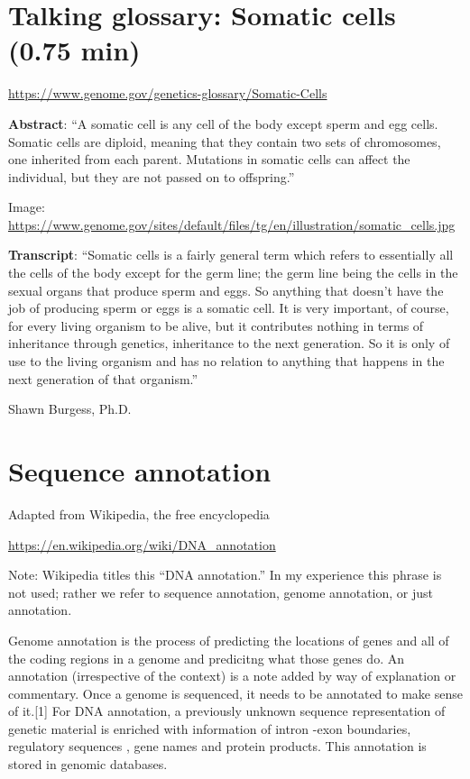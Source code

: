 \documentclass[
]{book}
\begin{document}
\hypertarget{talking-glossary-somatic-cells-0.75-min}{%
\section{Talking glossary: Somatic cells (0.75 min)}\label{talking-glossary-somatic-cells-0.75-min}}

\url{https://www.genome.gov/genetics-glossary/Somatic-Cells}

\textbf{Abstract}: ``A somatic cell is any cell of the body except sperm and egg cells. Somatic cells are diploid, meaning that they contain two sets of chromosomes, one inherited from each parent. Mutations in somatic cells can affect the individual, but they are not passed on to offspring.''

Image: \url{https://www.genome.gov/sites/default/files/tg/en/illustration/somatic_cells.jpg}

\textbf{Transcript}: ``Somatic cells is a fairly general term which refers to essentially all the cells of the body except for the germ line; the germ line being the cells in the sexual organs that produce sperm and eggs. So anything that doesn't have the job of producing sperm or eggs is a somatic cell. It is very important, of course, for every living organism to be alive, but it contributes nothing in terms of inheritance through genetics, inheritance to the next generation. So it is only of use to the living organism and has no relation to anything that happens in the next generation of that organism.''

Shawn Burgess, Ph.D.

\hypertarget{sequence-annotation}{%
\section{Sequence annotation}\label{sequence-annotation}}

Adapted from Wikipedia, the free encyclopedia

\url{https://en.wikipedia.org/wiki/DNA_annotation}

Note: Wikipedia titles this ``DNA annotation.'' In my experience this phrase is not used; rather we refer to sequence annotation, genome annotation, or just annotation.

Genome annotation is the process of predicting the locations of genes and all of the coding regions in a genome and predicitng what those genes do. An annotation (irrespective of the context) is a note added by way of explanation or commentary. Once a genome is sequenced, it needs to be annotated to make sense of it.{[}1{]}
For DNA annotation, a previously unknown sequence representation of genetic material is enriched with information of intron -exon boundaries, regulatory sequences , gene names and protein products. This annotation is stored in genomic databases.
\end{document}
